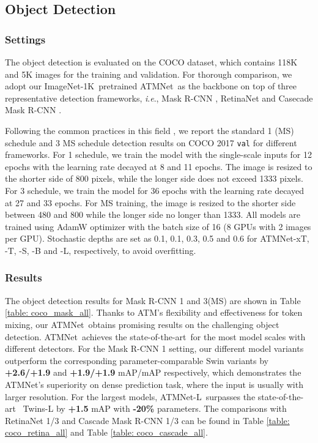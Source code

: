 \documentclass[letterpaper]{article} \usepackage{aaai23v}  \usepackage{times}  \usepackage{helvet}  \usepackage{courier}  \usepackage[hyphens]{url}  \usepackage{graphicx} \urlstyle{rm} \def\UrlFont{\rm}  \usepackage{caption} \frenchspacing  \setlength{\pdfpagewidth}{8.5in}  \setlength{\pdfpageheight}{11in}  \usepackage{algorithm}
\newcommand{\ieno}{\textit{i}.\textit{e}.}
\newcommand{\ours}{{ATMNet}}
\newcommand{\ourcore}{{ATM}}
\newcommand{\oursxt}{ATMNet-xT}
\newcommand{\oursl}{ATMNet-L}
\newcommand{\imntk}{ImageNet-1K}
\newcommand{\sota}{state-of-the-art}
\begin{document}
\subsection{Object Detection}
\label{sec: det}




\noindent
\subsubsection{Settings}
The object detection is evaluated on the COCO \cite{lin2014microsoftcoco} dataset, which contains 118K and 5K images for the training and validation. For thorough comparison, we adopt our \imntk~pretrained \ours~as the backbone on top of three representative detection frameworks, \ieno, Mask R-CNN \cite{he2017maskrcnn}, RetinaNet \cite{lin2017FocallossRetinaNet} and Casecade Mask R-CNN \cite{cai2018cascade,he2017maskrcnn}.

Following the common practices in this field \cite{liu2021swin,dong2021cswin,chen2022cyclemlp,wang2021pyramidpvt,tang2021imagewavemlp}, we report the standard 1 (MS) schedule and 3 MS schedule detection results on COCO 2017 \texttt{val} for different frameworks. For 1 schedule, we train the model with the single-scale inputs for 12 epochs with the learning rate decayed at 8 and 11 epochs. The image is resized to the shorter side of 800 pixels, while the longer side does not exceed 1333 pixels. For 3 schedule, we train the model for 36 epochs with the learning rate decayed at 27 and 33 epochs. For MS training, the image is resized to the shorter side between 480 and 800 while the longer side no longer than 1333. All models are trained using AdamW \cite{loshchilov2017decoupledadamw} optimizer with the batch size of 16 (8 GPUs with 2 images per GPU). Stochastic depths are set as 0.1, 0.1, 0.3, 0.5 and 0.6 for \oursxt, -T, -S, -B and -L, respectively, to avoid overfitting.



\noindent
\subsubsection{Results} 
\noindent
The object detection results for Mask R-CNN 1 and 3(MS)
are shown in Table \ref{table: coco_mask_all}. 
Thanks to \ourcore's flexibility and effectiveness for token mixing, our \ours~obtains promising results on the challenging object detection. \ours~achieves the \sota~for the most model scales with different detectors.
For the Mask R-CNN 1 setting, our different model variants outperform the corresponding parameter-comparable Swin variants by \textbf{+2.6/+1.9} and \textbf{+1.9/+1.9} mAP/mAP respectively, which demonstrates the \ours's superiority on dense prediction task, where the input is usually with larger resolution. 
For the largest models, \oursl~surpasses the \sota~ Twins-L by \textbf{+1.5} mAP with \textbf{-20\%} parameters. The comparisons with RetinaNet 1/3 and Cascade Mask R-CNN 1/3 can be found in Table \ref{table: coco_retina_all} and Table \ref{table: coco_cascade_all}.
\end{document}
